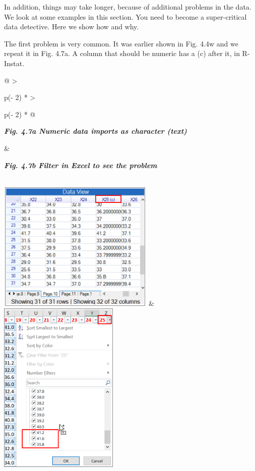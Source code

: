 \documentclass[
  letterpaper,
  DIV=11,
  numbers=noendperiod]{scrreprt}
\begin{document}
In addition, things may take longer, because of additional problems in
the data. We look at some examples in this section. You need to become a
super-critical data detective. Here we show how and why.

The first problem is very common. It was earlier shown in Fig. 4.4w and
we repeat it in Fig. 4.7a. A column that should be numeric has a (c)
after it, in R-Instat.

\begin{longtable}[]{@{}
  >{\raggedright\arraybackslash}p{(\columnwidth - 2\tabcolsep) * }
  >{\raggedright\arraybackslash}p{(\columnwidth - 2\tabcolsep) * }@{}}
\toprule\noalign{}
\begin{minipage}[b]{\linewidth}\raggedright
\textbf{\emph{Fig. 4.7a Numeric data imports as character (text)}}
\end{minipage} & \begin{minipage}[b]{\linewidth}\raggedright
\textbf{\emph{Fig. 4.7b Filter in Excel to see the problem}}
\end{minipage} \\
\midrule\noalign{}
\endhead
\bottomrule\noalign{}
\endlastfoot
\includegraphics[width=2.94236in,height=2.44857in]{figures/Fig4.7a.png}
&
\includegraphics[width=2.25108in,height=3.28884in]{figures/Fig4.7b.png} \\
\end{longtable}
\end{document}
